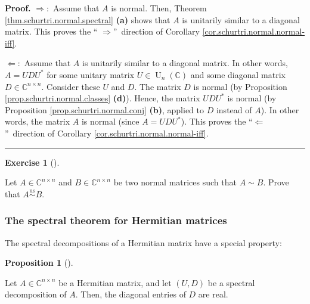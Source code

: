 \documentclass[numbers=enddot,12pt,final,onecolumn,notitlepage]{scrartcl}%
\newcounter{exer}
\numberwithin{exer}{subsection}
\theoremstyle{definition}
\newtheorem{prop}[theo]{Proposition}
\newenvironment{proposition}[1][]
{\begin{prop}[#1]\begin{leftbar}}
{\end{leftbar}\end{prop}}
\newtheorem{exmp}[exer]{Exercise}
\newenvironment{exercise}[1][]
{\begin{exmp}[#1]\begin{leftbar}}
{\end{leftbar}\end{exmp}}
\newenvironment{proof}[1][Proof]{\noindent\textbf{#1.} }{\ \rule{0.5em}{0.5em}}
\begin{document}
\begin{proof}
$\Longrightarrow:$ Assume that $A$ is normal. Then, Theorem
\ref{thm.schurtri.normal.spectral} \textbf{(a)} shows that $A$ is unitarily
similar to a diagonal matrix. This proves the \textquotedblleft%
$\Longrightarrow$\textquotedblright\ direction of Corollary
\ref{cor.schurtri.normal.normal-iff}. \medskip

$\Longleftarrow:$ Assume that $A$ is unitarily similar to a diagonal matrix.
In other words, $A=UDU^{\ast}$ for some unitary matrix $U\in\operatorname*{U}%
\nolimits_{n}\left(  \mathbb{C}\right)  $ and some diagonal matrix
$D\in\mathbb{C}^{n\times n}$. Consider these $U$ and $D$. The matrix $D$ is
normal (by Proposition \ref{prop.schurtri.normal.classes} \textbf{(d)}).
Hence, the matrix $UDU^{\ast}$ is normal (by Proposition
\ref{prop.schurtri.normal.conj} \textbf{(b)}, applied to $D$ instead of $A$).
In other words, the matrix $A$ is normal (since $A=UDU^{\ast}$). This proves
the \textquotedblleft$\Longleftarrow$\textquotedblright\ direction of
Corollary \ref{cor.schurtri.normal.normal-iff}.
\end{proof}

\begin{exercise}
 Let $A\in\mathbb{C}^{n\times n}$ and $B\in\mathbb{C}^{n\times n}$ be
two normal matrices such that $A\sim B$. Prove that
$A\overset{\operatorname*{us}}{\sim}B$.
\end{exercise}

\subsubsection{The spectral theorem for Hermitian matrices}

The spectral decompositions of a Hermitian matrix have a special property:

\begin{proposition}
\label{prop.schurtri.normal.hermitian-spec}Let $A\in\mathbb{C}^{n\times n}$ be
a Hermitian matrix, and let $\left(  U,D\right)  $ be a spectral decomposition
of $A$. Then, the diagonal entries of $D$ are real.
\end{proposition}
\end{document}
